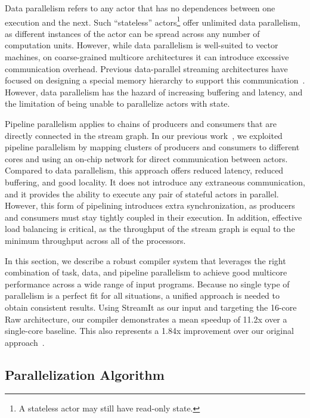 Data parallelism refers to any actor that has no dependences between
one execution and the next.  Such ``stateless'' actors\footnote{A
  stateless actor may still have read-only state.}  offer unlimited
data parallelism, as different instances of the actor can be spread
across any number of computation units.  However, while data
parallelism is well-suited to vector machines, on coarse-grained
multicore architectures it can introduce excessive communication
overhead.  Previous data-parallel streaming architectures have focused
on designing a special memory hierarchy to support this
communication~\cite{imagine03ieee}.  However, data parallelism has the
hazard of increasing buffering and latency, and the limitation of
being unable to parallelize actors with state.

Pipeline parallelism applies to chains of producers and consumers that
are directly connected in the stream graph.  In our previous
work~\cite{streamit-asplos}, we exploited pipeline parallelism by
mapping clusters of producers and consumers to different cores and
using an on-chip network for direct communication between actors.
Compared to data parallelism, this approach offers reduced latency,
reduced buffering, and good locality.  It does not introduce any
extraneous communication, and it provides the ability to execute any
pair of stateful actors in parallel.  However, this form of pipelining
introduces extra synchronization, as producers and consumers must stay
tightly coupled in their execution.  In addition, effective load
balancing is critical, as the throughput of the stream graph is equal
to the minimum throughput across all of the processors.

In this section, we describe a robust compiler system that leverages
the right combination of task, data, and pipeline parallelism to
achieve good multicore performance across a wide range of input
programs.  Because no single type of parallelism is a perfect fit for
all situations, a unified approach is needed to obtain consistent
results.  Using StreamIt as our input and targeting the 16-core Raw
architecture, our compiler demonstrates a mean speedup of 11.2x over a
single-core baseline.  This also represents a 1.84x improvement over
our original approach~\cite{streamit-asplos}.

\subsection*{Parallelization Algorithm}

